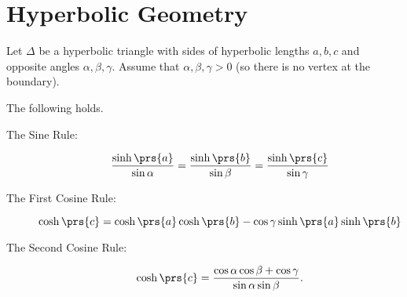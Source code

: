\documentclass[10pt, twoside]{book}
\begin{document}
\section{Hyperbolic Geometry}

\begin{theorem}
Let $\Delta$ be a hyperbolic triangle with sides of hyperbolic lengths $a,b,c$ and opposite angles $\alpha,\beta,\gamma$.
Assume that $\alpha,\beta,\gamma > 0$ (so there is no vertex at the boundary).

The following holds.

\begin{description}
\item[The Sine Rule:]
\[\frac{\sinh\prs{a}}{\sin \alpha} = \frac{\sinh\prs{b}}{\sin \beta} = \frac{\sinh\prs{c}}{\sin \gamma}\]
\item[The First Cosine Rule:]
\[\cosh\prs{c} = \cosh\prs{a} \cosh\prs{b} - \cos\gamma \sinh\prs{a} \sinh\prs{b}\]
\item[The Second Cosine Rule:]
\[\cosh\prs{c} = \frac{\cos\alpha\cos\beta + \cos\gamma}{\sin \alpha \sin \beta} \text{.}\]
\end{description}
\end{theorem}
\end{document}

